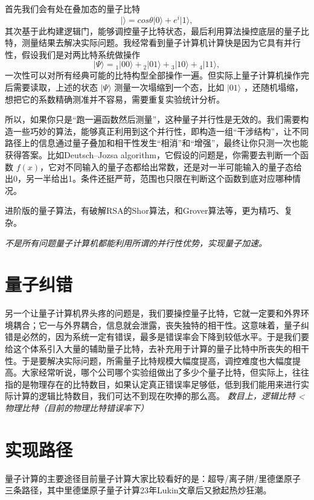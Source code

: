 \documentclass[12pt,a4paper]{article}
\begin{document}
首先我们会有处在叠加态的量子比特 
$$
|\rangle = cos\theta |0\rangle + e^{i} |1\rangle,
$$
其次基于此构建逻辑门，能够调控量子比特状态，最后利用算法操控底层的量子比特，测量结果去解决实际问题。我经常看到量子计算机计算快是因为它具有并行性，假设我们是对两比特系统做操作
$$
|\Psi\rangle={ }_1|00\rangle+{ }_2|01\rangle+{ }_3|10\rangle+{ }_4|11\rangle,
$$
一次性可以对所有经典可能的比特构型全部操作一遍。但实际上量子计算机操作完后需要读取，上述的状态 $| \Psi \rangle$ 测量一次塌缩到一个态，比如 $|01\rangle$ ，还随机塌缩，想把它的系数精确测准并不容易，需要重复实验统计分析。

所以，如果你只是“跑一遍函数然后测量”，这种量子并行性是无效的。我们需要构造一些巧妙的算法，能够真正利用到这个并行性，即构造一组“干涉结构”，让不同路径上的信息通过量子叠加和相干性发生“相消”和“增强”，最终让你只测一次也能获得答案。比如Deutsch–Jozsa algorithm，它假设的问题是，你需要去判断一个函数 $f(x)$，它对不同输入的量子态都给出常数，还是对一半可能输入的量子态给出0，另一半给出1。条件还挺严苛，范围也只限在判断这个函数到底对应哪种情况。

进阶版的量子算法，有破解RSA的Shor算法，和Grover算法等，更为精巧、复杂。

\it{不是所有问题量子计算机都能利用所谓的并行性优势，实现量子加速。}

\section{量子纠错}
另一个让量子计算机界头疼的问题是，我们要操控量子比特，它就一定要和外界环境耦合；它一与外界耦合，信息就会泄露，丧失独特的相干性。这意味着，量子纠错是必然的，因为系统一定有错误，最多是错误率会下降到较低水平。于是我们要给这个体系引入大量的辅助量子比特，去补充用于计算的量子比特中所丧失的相干性。于是要解决实际问题，所需量子比特规模大幅度提高，调控难度也大幅度提高。大家经常听说，哪个公司哪个实验组做出了多少个量子比特，但实际上，往往指的是物理存在的比特数目，如果认定真正错误率足够低，低到我们能用来进行实际计算的逻辑比特数目，我们可达不到现在吹捧的那么高。
\it{数目上，逻辑比特 < 物理比特（目前的物理比特错误率下）}


\section{实现路径}
量子计算的主要途径目前量子计算大家比较看好的是：超导/离子阱/里德堡原子 三条路径，其中里德堡原子量子计算23年Lukin文章后又掀起热炒狂潮。
\end{document}
